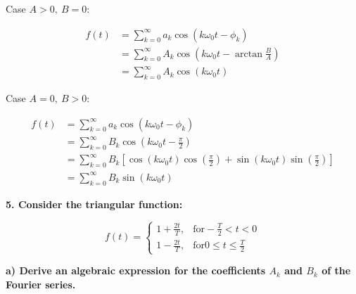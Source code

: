 Case $A>0,\ B=0$:

\begin{align*}
	f(t) &= \sum_{k=0}^\infty a_k \cos(k \omega_0 t - \phi_k) \\
	&= \sum_{k=0}^\infty A_k \cos\left(k \omega_0 t - \arctan{\frac{B}{A}}\right) \\
	&= \sum_{k=0}^\infty A_k \cos(k \omega_0 t) 
\end{align*}

Case $A=0,\ B>0$:

\begin{align*}
	f(t) &= \sum_{k=0}^\infty a_k \cos(k \omega_0 t - \phi_k) \\
	&= \sum_{k=0}^\infty B_k \cos\left(k \omega_0 t - \frac{\pi}{2}\right) \\
	&= \sum_{k=0}^\infty B_k \left[\cos(k \omega_0 t) \cos\left(\frac{\pi}{2}\right) + \sin(k \omega_0 t) \sin\left(\frac{\pi}{2}\right) \right]\\
	&= \sum_{k=0}^\infty B_k \sin(k \omega_0 t) 
\end{align*}

\textbf{5. Consider the triangular function:}

\[
	f(t) = 
	\begin{cases}
		1+\frac{2t}{T},& \text{for} - \frac{T}{2}<t<0\\
		1-\frac{2t}{T},& \text{for} 0\leq t \leq \frac{T}{2}
	\end{cases}
\]

\textbf{a) Derive an algebraic expression for the coefficients $A_k$ and $B_k$ of the Fourier series.}



